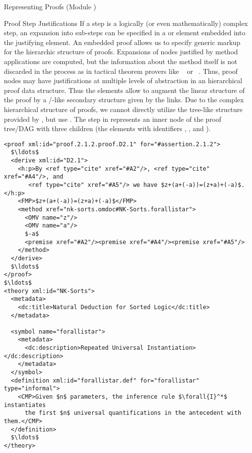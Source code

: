 \begin{omgroup}[id=proofs,short=Representing Proofs]{Representing Proofs (Module {})}
\begin{module}[id=justifications]
\begin{omgroup}[id=proofs.justifications]{Proof Step Justifications}
  If a  step is a logically (or even mathematically) complex step, an
  expansion into sub-steps can be specified in a  or
   element embedded into the justifying  element.
  An embedded proof allows us to specify generic markup for the hierarchic structure of
  proofs. Expansions of nodes justified by method applications are computed, but the
  information about the method itself is not discarded in the process as in tactical
  theorem provers like {\isabelle}~\cite{Paulson:iagtp94} or {\nuprl}~\cite{Constable86}.
  Thus, proof nodes may have justifications at multiple levels of abstraction in an
  hierarchical proof data structure.  Thus the  elements allow to
  augment the linear structure of the proof by a {}/{}-like
  secondary structure given by the  links. Due to the complex
  hierarchical structure of proofs, we cannot directly utilize the tree-like structure
  provided by {\xml}, but use .  The
   step in {} represents an inner node of the proof
  tree/DAG with three children (the elements with identifiers {},
  {}, and {}).

\begin{lstlisting}[label=lst:derive,mathescape,
  caption={A \element{derive} Proof Step},index={derive,method,premise}]
<proof xml:id="proof.2.1.2.proof.D2.1" for="#assertion.2.1.2">
  $\ldots$
  <derive xml:id="D2.1">
    <h:p>By <ref type="cite" xref="#A2"/>, <ref type="cite" xref="#A4"/>, and
       <ref type="cite" xref="#A5"/> we have $z+(a+(-a))=(z+a)+(-a)$.</h:p>
    <FMP>$z+(a+(-a))=(z+a)+(-a)$</FMP>
    <method xref="nk-sorts.omdoc#NK-Sorts.forallistar">
      <OMV name="z"/>
      <OMV name="a"/>
      $-a$
      <premise xref="#A2"/><premise xref="#A4"/><premise xref="#A5"/>
    </method>
  </derive>
  $\ldots$
</proof>
$\ldots$
<theory xml:id="NK-Sorts">
  <metadata>
    <dc:title>Natural Deduction for Sorted Logic</dc:title>
  </metadata>
  
  <symbol name="forallistar">
    <metadata>
      <dc:description>Repeated Universal Instantiation></dc:description>
    </metadata>
  </symbol>
  <definition xml:id="forallistar.def" for="forallistar" type="informal">
    <CMP>Given $n$ parameters, the inference rule $\forall{I}^*$ instantiates 
      the first $n$ universal quantifications in the antecedent with them.</CMP>
  </definition>
  $\ldots$
</theory>
\end{lstlisting}


\end{omgroup}
\end{module}
\end{omgroup}
